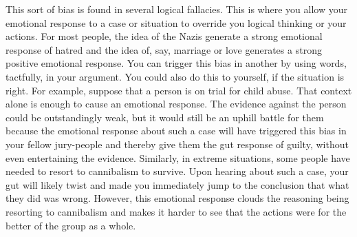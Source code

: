 This sort of bias is found in several logical fallacies. This is where you allow your emotional response to a case or situation to override you logical thinking or your actions.  For most people, the idea of the Nazis generate a strong emotional response of hatred and the idea of, say, marriage or love generates a strong positive emotional response. You can trigger this bias in another by using words, tactfully, in your argument. You could also do this to yourself, if the situation is right. For example, suppose that a person is on trial for child abuse. That context alone is enough to cause an emotional response. The evidence against the person could be outstandingly weak, but it would still be an uphill battle for them because the emotional response about such a case will have triggered this bias in your fellow jury-people and thereby give them the gut response of guilty, without even entertaining the evidence. Similarly, in extreme situations, some people have needed to resort to cannibalism to survive. Upon hearing about such a case, your gut will likely twist and made you immediately jump to the conclusion that what they did was wrong. However, this emotional response clouds the reasoning being resorting to cannibalism and makes it harder to see that the actions were for the better of the group as a whole.

